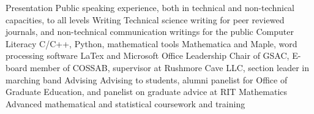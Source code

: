 \begin{cvskills}
  \cvskill
    {Presentation}
    {Public speaking experience, both in technical and non-technical capacities, to all levels}
  \cvskill
    {Writing}
    {Technical science writing for peer reviewed journals, and non-technical communication writings for the public} 
  \cvskill
    {Computer Literacy}
    {C/C++, Python, mathematical tools Mathematica and Maple, word processing software LaTex and Microsoft Office}
  \cvskill
    {Leadership}
    {Chair of GSAC, E-board member of COSSAB, supervisor at Rushmore Cave LLC, section leader in marching band}
   \cvskill
    {Advising}
    {Advising to students, alumni panelist for Office of Graduate Education, and panelist on graduate advice at RIT}   
  \cvskill
    {Mathematics}
    {Advanced mathematical and statistical coursework and training}
  
\end{cvskills}
